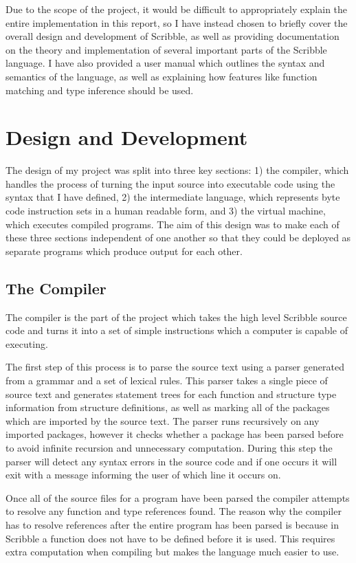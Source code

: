 \documentclass[]{final_report}
\begin{document}
Due to the scope of the project, it would be difficult to appropriately explain the entire implementation in this report, so I have instead chosen to briefly cover the overall design and development of Scribble, as well as providing documentation on the theory and implementation of several important parts of the Scribble language. I have also provided a user manual which outlines the syntax and semantics of the language, as well as explaining how features like function matching and type inference should be used.

\chapter{Design and Development}


The design of my project was split into three key sections: 1) the compiler, which handles the process of turning the input source into executable code using the syntax that I have defined, 2) the intermediate language, which represents byte code instruction sets in a human readable form, and 3) the virtual machine, which executes compiled programs. The aim of this design was to make each of these three sections independent of one another so that they could be deployed as separate programs which produce output for each other.

\section{The Compiler}

The compiler is the part of the project which takes the high level Scribble source code and turns it into a set of simple instructions which a computer is capable of executing. 

The first step of this process is to parse the source text using a parser generated from a grammar and  a set of lexical rules. This parser takes a single piece of source text and generates statement trees for each function and structure type information from structure definitions, as well as marking all of the packages which are imported by the source text. The parser runs recursively on any imported packages, however it checks whether a package has been parsed before to avoid infinite recursion and unnecessary computation. During this step the parser will detect any syntax errors in the source code and if one occurs it will exit with a message informing the user of which line it occurs on.

Once all of the source files for a program have been parsed the compiler attempts to resolve any function and type references found. The reason why the compiler has to resolve references after the entire program has been parsed is because in Scribble a function does not have to be defined before it is used. This requires extra computation when compiling but makes the language much easier to use.
\end{document}
